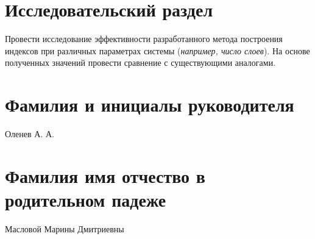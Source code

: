 \documentclass{bmstu}
\begin{document}
\section*{Исследовательский раздел}

Провести исследование эффективности разработанного метода построения индексов
при различных параметрах системы (\textit{например, число слоев}). На основе
полученных значений провести сравнение с существующими аналогами.

\section*{Фамилия и инициалы руководителя}

Оленев А. А.

\section*{Фамилия имя отчество в родительном падеже}

Масловой Марины Дмитриевны
\end{document}
